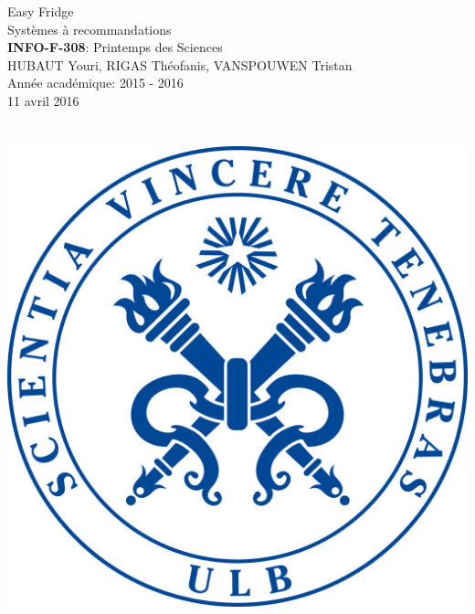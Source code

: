 \documentclass[10pt,a4paper]{report}
\begin{document}

\begin{titlepage}
    \vspace*{\fill}
    \begin{center}
        \huge {Easy Fridge} \\
	    Systèmes à recommandations \\
	    \textbf{INFO-F-308}: Printemps des Sciences \\
	
	    \Large {HUBAUT Youri, RIGAS Théofanis, VANSPOUWEN Tristan}\\
        Année académique: 2015 - 2016\\
	    11 avril 2016 \\
	      \\
	      \\
	    \includegraphics[scale=0.1]{logo_ulb.jpg}
    \end{center}
    \vspace*{\fill}

\end{titlepage}

\newpage

\tableofcontents

\newpage










\end{document}
